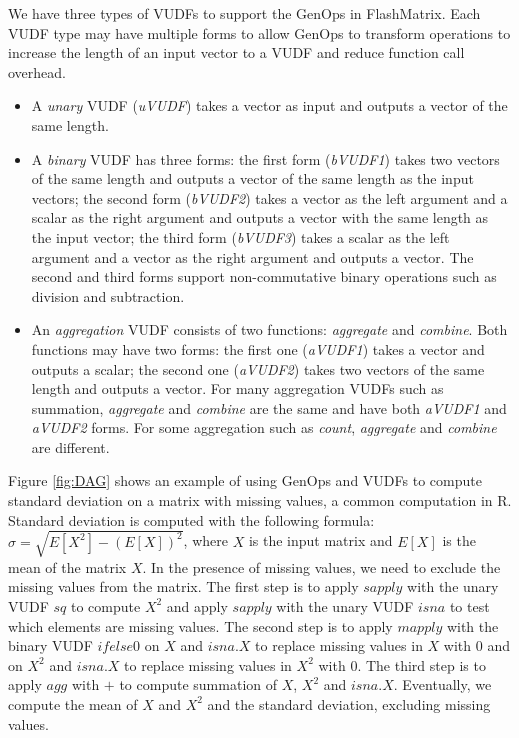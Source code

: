 We have three types of VUDFs to support the GenOps in FlashMatrix. Each VUDF
type may have multiple forms to allow GenOps to transform operations to
increase the length of an input vector to a VUDF and reduce function call
overhead.
\begin{itemize}
	\item A \textit{unary} VUDF (\textit{uVUDF}) takes a vector
		as input and outputs a vector of the same length.
	\item A \textit{binary} VUDF has three forms: the first form (\textit{bVUDF1}) 
    takes two vectors of the same length and outputs
		a vector of the same length as the input vectors; the second form (\textit{bVUDF2}) 
    takes a vector as the left argument and a scalar
		as the right argument and outputs a vector with the same length as
		the input vector; the third form (\textit{bVUDF3}) takes a scalar
		as the left argument and a vector as the right argument and outputs
		a vector. The second and third forms support non-commutative binary
		operations such as division and subtraction.
	\item An \textit{aggregation} VUDF consists of two functions:
		\textit{aggregate} and \textit{combine}. Both functions may have two
		forms: the first one (\textit{aVUDF1}) takes a vector and
		outputs a scalar; the second one (\textit{aVUDF2}) takes
		two vectors of the same length and outputs a vector. For many
		aggregation VUDFs such as summation, \textit{aggregate} and
		\textit{combine} are the same and have both \textit{aVUDF1} and
		\textit{aVUDF2} forms. For some aggregation such as \textit{count},
		\textit{aggregate} and \textit{combine} are different.
\end{itemize}

Figure \ref{fig:DAG} shows an example of using GenOps and VUDFs to compute
standard deviation on a matrix with missing values, a common computation in R.
Standard deviation is computed with the following
formula: $\sigma = \sqrt{E[X^2] - (E[X])^2}$, where $X$ is the input matrix and
$E[X]$ is the mean of the matrix $X$. In the presence of missing values, we
need to exclude the missing values from the matrix. The first step is to apply
$sapply$ with the unary VUDF $sq$ to compute $X^2$ and apply $sapply$ with
the unary VUDF $isna$ to test which elements are missing values. The second
step is to apply $mapply$ with the binary VUDF $ifelse0$ on $X$ and $isna.X$
to replace missing
values in $X$ with 0 and on $X^2$ and $isna.X$ to replace missing values in
$X^2$ with 0. The third step is to apply $agg$ with $+$ to compute summation
of $X$, $X^2$ and $isna.X$. Eventually, we compute the mean of $X$ and
$X^2$ and the standard deviation, excluding missing values.

